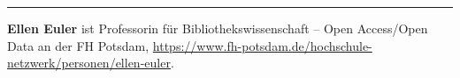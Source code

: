 \begin{center}\rule{0.5\linewidth}{0.5pt}\end{center}

\textbf{Ellen Euler} ist Professorin für Bibliothekswissenschaft -- Open
Access/Open Data an der FH Potsdam,
\url{https://www.fh-potsdam.de/hochschule-netzwerk/personen/ellen-euler}.

